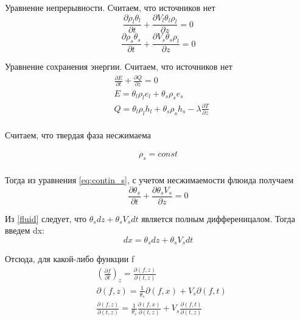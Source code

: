 \documentclass[12pt]{article}
\newcommand{\pd}[2]{\frac{\partial #1}{\partial #2}}
\begin{document}
Уравнение непрерывности. Считаем, что источников нет
\begin{equation}
\pd{\rho_l\theta_l}{t} + \pd{V_l\theta_l\rho_l}{z} =0
\label{eq:contin_l}
\end{equation}
\begin{equation}
\pd{\rho_s\theta_s}{t} + \pd{V_s\theta_s\rho_l}{z} =0
\label{eq:contin_s}
\end{equation}

Уравнение сохранения энергии. Считаем, что источников нет
\begin{equation}
\begin{aligned}
&\pd{E}{t} + \pd{Q}{z} =0 \\
&E=\theta_l\rho_l e_l + \theta_s\rho_s e_s \\
&Q=\theta_l\rho_l h_l + \theta_s\rho_s h_s - \lambda \pd{T}{z}\\
\label{eq:conserv}
\end{aligned}
\end{equation}

Считаем, что твердая фаза несжимаема

\begin{equation}
\begin{aligned}
\rho_s = const \\
\label{rho_const}
\end{aligned}
\end{equation}

Тогда из уравнения \eqref{eq:contin_s}, с учетом несжимаемости флюида получаем
\begin{equation}
\pd{\theta_s}{t} + \pd{\theta_s V_s}{z} = 0
\label{fluid}
\end{equation}

Из \eqref{fluid} следует, что $\theta_s dz + \theta_s V_s dt $ является полным дифференицалом. Тогда введем dx:
\begin{equation}
dx = \theta_s dz + \theta_s V_s dt
\label{dx_dz}
\end{equation}

Отсюда, для какой-либо функции f 
\begin{equation}
\begin{aligned}
&\left(\pd{f}{t}\right)_z = \pd{(f , z)}{(t , z)}\\
&\partial(f , z) = \frac{1}{\theta_s}\partial(f , x) + V_s \partial(f , t)\\
&\pd{(f , z)}{(t , z)} = \frac{1}{\theta_s}\pd{(f , x)}{(t , z)} + V_s\pd{(f , t)}{(t , z)}\\
\end{aligned}
\label{help1}
\end{equation}
\end{document}
